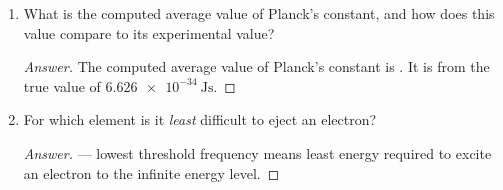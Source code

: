 \documentclass[../psets.tex]{subfiles}
\begin{document}
\begin{enumerate}
\begin{enumerate}
\begin{proof}[Answer]
\begin{table}[h!]
\begin{tabular}{|l|l|l|l|l|l|}
                    \hline
                \end{tabular}
                \caption{Photoelectric data for , , , and .}
                \label{tab:photoelectricData}
            \end{table}
        \end{proof}
        \item What is the computed average value of Planck's constant, and how does this value compare to its experimental value?
        \begin{proof}[Answer]
            The computed average value of Planck's constant is . It is  from the true value of $\SI{6.626e-34}{\joule\second}$.
        \end{proof}
        \item For which element is it \emph{least} difficult to eject an electron?
        \begin{proof}[Answer]
             --- lowest threshold frequency means least energy required to excite an electron to the infinite energy level.
        \end{proof}
    \end{enumerate}
\end{enumerate}
\end{document}
